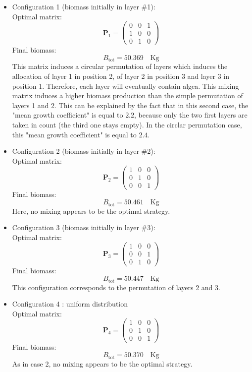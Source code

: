 \documentclass{article}
\begin{document}
\begin{itemize}
    \item Configuration 1 (biomass initially in layer \#1):\\
        Optimal matrix:
        \[
        \mathbf{P}_1 =
        \begin{pmatrix}
        0 & 0 & 1 \\
        1 & 0 & 0 \\
        0 & 1 & 0
        \end{pmatrix}
        \]
        Final biomass:
        \[
        B_{\text{tot}} = 50.369 \quad \mathrm{Kg}
        \]
        This matrix induces a circular permutation of layers which induces the allocation of layer 1 in position 2, 
        of layer 2 in position 3 and layer 3 in position 1. Therefore, each layer will eventually contain algea. This mixing matrix induces a higher biomass production than the simple permutation of layers 1 and 2. 
        This can be explained by the fact that in this second case, the "mean growth coefficient" is equal to $2.2$, because only the two first layers are taken in count 
        (the third one stays empty). In the circlar permutation case, this "mean growth coefficient" is equal to $2.4$. 

    \item Configuration 2 (biomass initially in layer \#2): \\
        Optimal matrix:
        \[
        \mathbf{P}_2 =
        \begin{pmatrix}
        1 & 0 & 0 \\
        0 & 1 & 0 \\
        0 & 0 & 1
        \end{pmatrix}
        \]
        Final biomass:
        \[
        B_{\text{tot}} = 50.461 \quad \mathrm{Kg}
        \]
        Here, no mixing appears to be the optimal strategy.

    \item Configuration 3 (biomass initially in layer \#3): \\
        Optimal matrix:
        \[
        \mathbf{P}_3 =
        \begin{pmatrix}
        1 & 0 & 0 \\
        0 & 0 & 1 \\
        0 & 1 & 0
        \end{pmatrix}
        \]
        Final biomass:
        \[
        B_{\text{tot}} = 50.447 \quad \mathrm{Kg}
        \]
        This configuration corresponds to the permutation of layers 2 and 3.
    \item Configuration 4 : uniform distribution \\
        Optimal matrix:
        \[
        \mathbf{P}_4 =
        \begin{pmatrix}
        1 & 0 & 0 \\
        0 & 1 & 0 \\
        0 & 0 & 1
        \end{pmatrix}
        \]
        Final biomass:
        \[
        B_{\text{tot}} = 50.370 \quad \mathrm{Kg}
        \]
        As in case 2, no mixing appears to be the optimal strategy.
\end{itemize}
\end{document}

